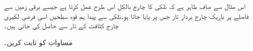 \begin{itemize}
\end{itemize}

اس مثال سے صاف ظاہر ہے کہ نلکی کا چارج بالکل اس طرح عمل کرتا ہے جیسے برقی زمین سے   فاصلے پر باریک چارج بردار تار جس پر   پایا جاتا ہو۔نلکی سے پیدا ہم قوہ سطحیں اسی فرضی لکیری چارج کثافت کے تار سے حاصل کی جاتی ہیں۔

مساوات  کو ثابت کریں۔


